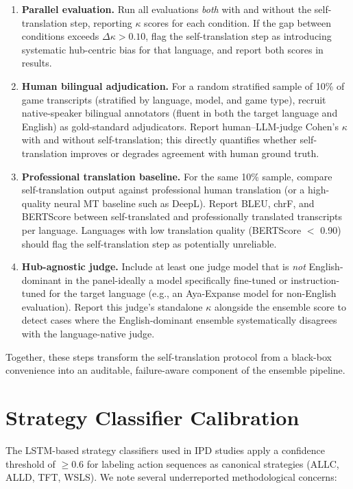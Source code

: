 \documentclass[11pt]{article}
\begin{document}
\begin{enumerate}[leftmargin=1.5em,itemsep=2pt]
\item \textbf{Parallel evaluation.} Run all evaluations \textit{both} with and without the self-translation step, reporting $\kappa$ scores for each condition. If the gap between conditions exceeds $\Delta\kappa > 0.10$, flag the self-translation step as introducing systematic hub-centric bias for that language, and report both scores in results.
\item \textbf{Human bilingual adjudication.} For a random stratified sample of 10\% of game transcripts (stratified by language, model, and game type), recruit native-speaker bilingual annotators (fluent in both the target language and English) as gold-standard adjudicators. Report human--LLM-judge Cohen's $\kappa$ with and without self-translation; this directly quantifies whether self-translation improves or degrades agreement with human ground truth.
\item \textbf{Professional translation baseline.} For the same 10\% sample, compare self-translation output against professional human translation (or a high-quality neural MT baseline such as DeepL). Report BLEU, chrF, and BERTScore between self-translated and professionally translated transcripts per language. Languages with low translation quality (BERTScore $<$ 0.90) should flag the self-translation step as potentially unreliable.
\item \textbf{Hub-agnostic judge.} Include at least one judge model that is \textit{not} English-dominant in the panel-ideally a model specifically fine-tuned or instruction-tuned for the target language (e.g., an Aya-Expanse model for non-English evaluation). Report this judge's standalone $\kappa$ alongside the ensemble score to detect cases where the English-dominant ensemble systematically disagrees with the language-native judge.
\end{enumerate}

\noindent Together, these steps transform the self-translation protocol from a black-box convenience into an auditable, failure-aware component of the ensemble pipeline.

\section{Strategy Classifier Calibration}
\label{app:calibration}

The LSTM-based strategy classifiers used in IPD studies \citep{huynh2026moreatstake} apply a confidence threshold of $\geq 0.6$ for labeling action sequences as canonical strategies (ALLC, ALLD, TFT, WSLS). We note several underreported methodological concerns:
\end{document}
